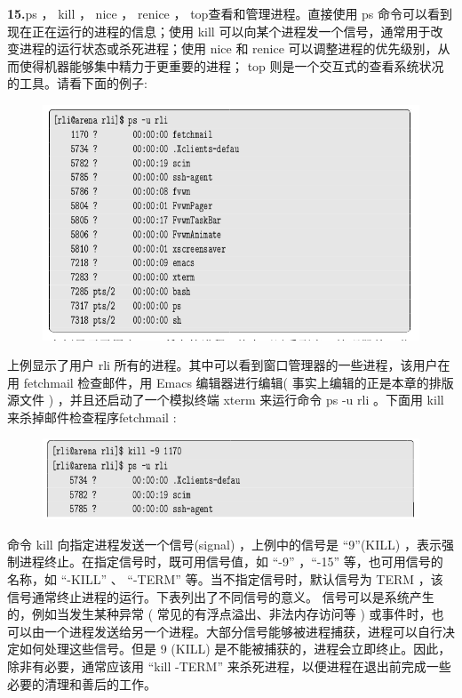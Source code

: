 \documentclass[12pt，a4paper]{article}
\numberwithin{equation}{section}
\begin{document}
\textbf{15.}ps ， kill ， nice ， renice ， top查看和管理进程。直接使用 ps 命令可以看到现在正在运行的进程的信息；使用 kill 可以向某个进程发一个信号，通常用于改变进程的运行状态或杀死进程；使用 nice 和 renice 可以调整进程的优先级别，从而使得机器能够集中精力于更重要的进程； top 则是一个交互式的查看系统状况的工具。请看下面的例子:
\begin{figure}[H]
\centering
\includegraphics[scale=0.6]{./figures/224.png}
\end{figure}
上例显示了用户 rli 所有的进程。其中可以看到窗口管理器的一些进程，该用户在用 fetchmail 检查邮件，用 Emacs 编辑器进行编辑( 事实上编辑的正是本章的排版源文件 ) ，并且还启动了一个模拟终端 xterm 来运行命令 ps -u rli 。下面用 kill 来杀掉邮件检查程序fetchmail :
\begin{figure}[H]
\centering
\includegraphics[scale=0.6]{./figures/225.png}
\end{figure}
命令 kill 向指定进程发送一个信号(signal) ，上例中的信号是 “9”(KILL) ，表示强制进程终止。在指定信号时，既可用信号值，如 “-9” ，“-15” 等，也可用信号的名称，如 “-KILL” 、 “-TERM” 等。当不指定信号时，默认信号为 TERM ，该信号通常终止进程的运行。下表列出了不同信号的意义。 信号可以是系统产生的，例如当发生某种异常 ( 常见的有浮点溢出、非法内存访问等 ) 或事件时，也可以由一个进程发送给另一个进程。大部分信号能够被进程捕获，进程可以自行决定如何处理这些信号。但是 9 (KILL) 是不能被捕获的，进程会立即终止。因此，除非有必要，通常应该用 “kill -TERM” 来杀死进程，以便进程在退出前完成一些必要的清理和善后的工作。
\end{document}
